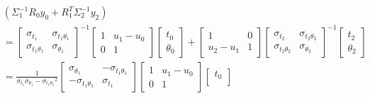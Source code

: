 \documentclass[a4paper,landscape]{article}
\begin{document}
        \begin{align*}
            &\left( \Sigma_1^{-1} R_0 y_0 + R_1^T \Sigma_2^{-1} y_2 \right)
            \\
            &=
            \begin{bmatrix}
                \sigma_{t_1} & \sigma_{t_1\theta_1}\\
                \sigma_{t_1\theta_1} & \sigma_{\theta_1}
            \end{bmatrix}^{-1}
            \begin{bmatrix}
                1 & u_1-u_0\\
                0 & 1
            \end{bmatrix}
            \begin{bmatrix}
                t_0\\
                \theta_0
            \end{bmatrix}
            +
            \begin{bmatrix}
                1 & 0\\
                u_2-u_1 & 1
            \end{bmatrix}
            \begin{bmatrix}
                \sigma_{t_2} & \sigma_{t_2\theta_2}\\
                \sigma_{t_2\theta_2} & \sigma_{\theta_2}
            \end{bmatrix}^{-1}
            \begin{bmatrix}
                t_2\\
                \theta_2
            \end{bmatrix}
            \\
            &=
            \tfrac{1}{\sigma_{t_1}\sigma_{\theta_1}-{\sigma_{t_1\theta_1}}^2}
            \begin{bmatrix}
                \sigma_{\theta_1} & -\sigma_{t_1\theta_1}\\
                -\sigma_{t_1\theta_1} & \sigma_{t_1}
            \end{bmatrix}
            \begin{bmatrix}
                1 & u_1-u_0\\
                0 & 1
            \end{bmatrix}
            \begin{bmatrix}
                t_0\\

\end{bmatrix}
\end{align*}
\end{document}

